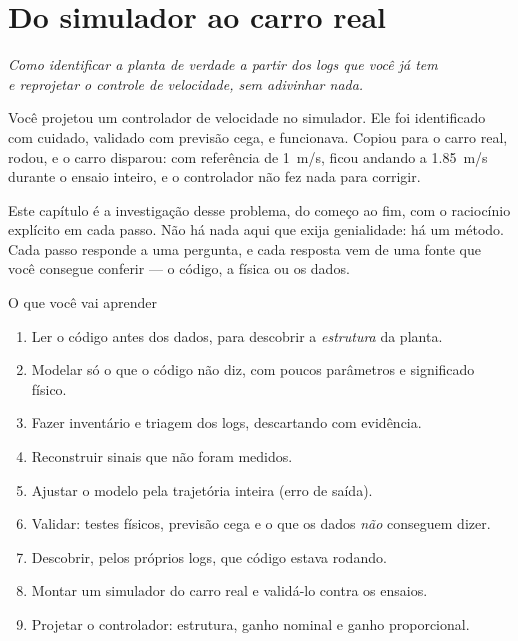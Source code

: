 \documentclass[11pt,a4paper,oneside,openany]{book}
\begin{document}
\chapter{Do simulador ao carro real}

\begin{center}
\itshape Como identificar a planta de verdade a partir dos logs que você já tem\\
e reprojetar o controle de velocidade, sem adivinhar nada.
\end{center}

\bigskip

Você projetou um controlador de velocidade no simulador. Ele foi identificado com
cuidado, validado com previsão cega, e funcionava. Copiou para o carro real, rodou,
e o carro disparou: com referência de \SI{1}{m/s}, ficou andando a \SI{1,85}{m/s}
durante o ensaio inteiro, e o controlador não fez nada para corrigir.

Este capítulo é a investigação desse problema, do começo ao fim, com o raciocínio
explícito em cada passo. Não há nada aqui que exija genialidade: há um método. Cada
passo responde a uma pergunta, e cada resposta vem de uma fonte que você consegue
conferir --- o código, a física ou os dados.

\begin{caixa}{O que você vai aprender}
\begin{enumerate}\itemsep0pt
  \item Ler o código antes dos dados, para descobrir a \emph{estrutura} da planta.
  \item Modelar só o que o código não diz, com poucos parâmetros e significado físico.
  \item Fazer inventário e triagem dos logs, descartando com evidência.
  \item Reconstruir sinais que não foram medidos.
  \item Ajustar o modelo pela trajetória inteira (erro de saída).
  \item Validar: testes físicos, previsão cega e o que os dados \emph{não} conseguem dizer.
  \item Descobrir, pelos próprios logs, que código estava rodando.
  \item Montar um simulador do carro real e validá-lo contra os ensaios.
  \item Projetar o controlador: estrutura, ganho nominal e ganho proporcional.
\end{enumerate}
\end{caixa}
\end{document}
